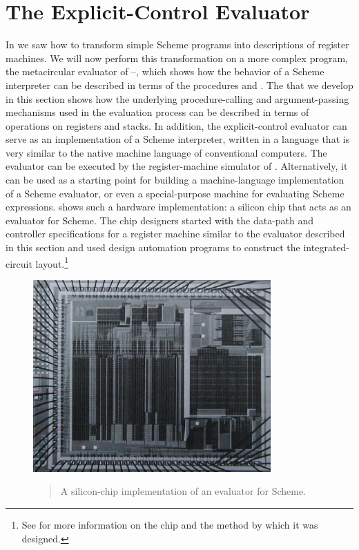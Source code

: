 \section{The Explicit-Control Evaluator}
\label{Section 5.4}

In  we saw how to transform simple Scheme programs into
descriptions of register machines.  We will now perform this transformation on
a more complex program, the metacircular evaluator of
--, which shows how the behavior of a Scheme interpreter
can be described in terms of the procedures  and .  The
 that we develop in this section shows how
the underlying procedure-calling and argument-passing mechanisms used in the
evaluation process can be described in terms of operations on registers and
stacks.  In addition, the explicit-control evaluator can serve as an
implementation of a Scheme interpreter, written in a language that is very
similar to the native machine language of conventional computers.  The
evaluator can be executed by the register-machine simulator of
.  Alternatively, it can be used as a starting point for building a
machine-language implementation of a Scheme evaluator, or even a
special-purpose machine for evaluating Scheme expressions.  
shows such a hardware implementation: a silicon chip that acts as an evaluator
for Scheme.  The chip designers started with the data-path and controller
specifications for a register machine similar to the evaluator described in
this section and used design automation programs to construct the
integrated-circuit layout.\footnote{See  for more information
on the chip and the method by which it was designed.}

\begin{figure}[tb]
\label{Figure 5.16}
\centering

\includegraphics[width=91mm]{fig/chap5/chip.jpg}
\begin{quote}
 A silicon-chip implementation of an evaluator for Scheme.
\end{quote}
\end{figure}

